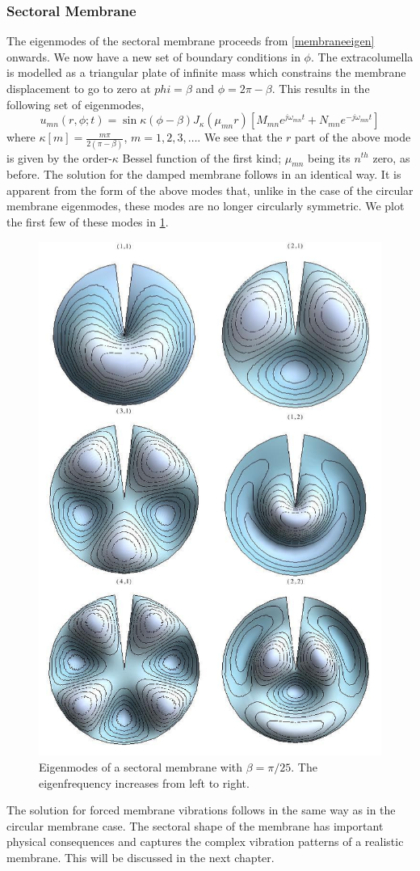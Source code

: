 \subsubsection{Sectoral Membrane}
The eigenmodes of the sectoral membrane proceeds from \eqref{membraneeigen} onwards. We now have a new set of boundary conditions in $\phi$.
The extracolumella is modelled as a triangular plate of infinite mass which constrains the membrane displacement to go to zero at $phi=\beta$
and $\phi=2\pi-\beta$. This results in the following set of eigenmodes,
\begin{equation}\label{sectoraleigenmode}
 u_{mn}(r,\phi;t)=\sin \kappa(\phi-\beta) J_\kappa(\mu_{mn} r)\left[M_{mn}e^{j\omega_{mn} t}+N_{mn}e^{-j\omega_{mn} t}\right]
\end{equation}
where $\kappa[m]=\frac{m\pi}{2(\pi-\beta)}$, $m=1,2,3,\ldots$. We see that the $r$ part of the above mode is given by the
order-$\kappa$ Bessel function of the first kind; $\mu_{mn}$ being its $n^{th}$ zero, as before. The solution for the damped
membrane follows in an identical way.
It is apparent from the form of the above modes that, unlike in the case of the circular membrane eigenmodes, these modes
are no longer circularly symmetric. We plot the first few of these modes in \ref{sectoralmembraneeigenmodes}. 
\begin{figure}[ht!]
 \centering
 \includegraphics[width=.6\linewidth]{Diagrams/SectorMembraneModes/membrane_modes_all.png}
 \caption[Sectoral membrane eigenmodes]{Eigenmodes of a sectoral membrane with $\beta=\pi/25$. The eigenfrequency increases from left to right.}
  \label{sectoralmembraneeigenmodes}
\end{figure}
The solution for forced membrane vibrations follows in the same way as in the circular membrane case. The sectoral shape of the membrane has important
physical consequences and captures the complex vibration patterns of a realistic membrane. This will be discussed in the next chapter.
